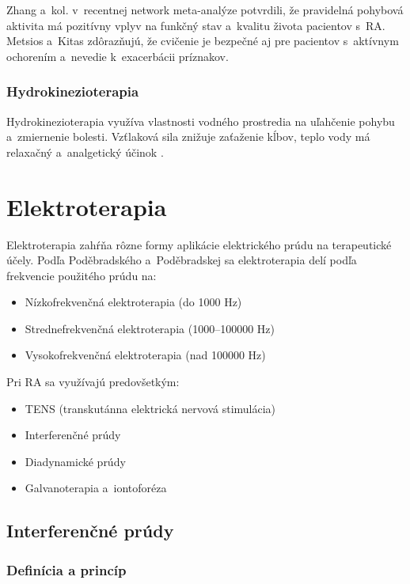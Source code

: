 Zhang a~kol. \parencite*{Zhang2025} v~recentnej network meta-analýze potvrdili, že pravidelná pohybová aktivita má pozitívny vplyv na funkčný stav a~kvalitu života pacientov s~RA. Metsios a~Kitas \parencite*{metsios2020} zdôrazňujú, že cvičenie je bezpečné aj pre pacientov s~aktívnym ochorením a~nevedie k~exacerbácii príznakov.

\subsubsection{Hydrokinezioterapia}

Hydrokinezioterapia využíva vlastnosti vodného prostredia na uľahčenie pohybu a~zmiernenie bolesti. Vzťlaková sila znižuje zaťaženie kĺbov, teplo vody má relaxačný a~analgetický účinok \parencite{Kolar2012}.

\section{Elektroterapia}

Elektroterapia zahŕňa rôzne formy aplikácie elektrického prúdu na terapeutické účely. Podľa Poděbradského a~Poděbradskej \parencite*{Podebradsky2009} sa elektroterapia delí podľa frekvencie použitého prúdu na:
\begin{itemize}
    \item Nízkofrekvenčná elektroterapia (do 1000 Hz)
    \item Strednefrekvenčná elektroterapia (1000--100000 Hz)
    \item Vysokofrekvenčná elektroterapia (nad 100000 Hz)
\end{itemize}

Pri RA sa využívajú predovšetkým:
\begin{itemize}
    \item TENS (transkutánna elektrická nervová stimulácia) \parencite{brosseau2003}
    \item Interferenčné prúdy \parencite{fuentes2010}
    \item Diadynamické prúdy
    \item Galvanoterapia a~iontoforéza
\end{itemize}

\subsection{Interferenčné prúdy}

\subsubsection{Definícia a princíp}

